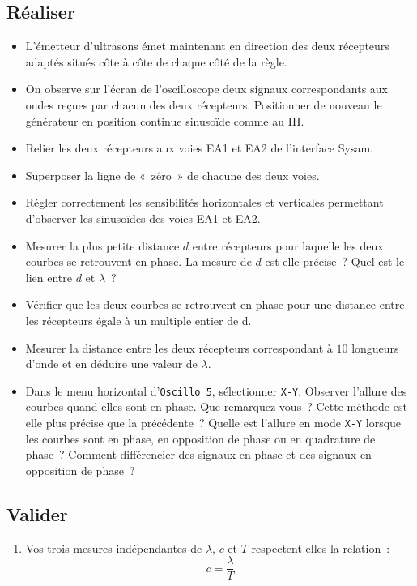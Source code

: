 \documentclass[a4paper, 11pt, final, garamond]{book}
\begin{document}
\subsection{Réaliser}

\begin{itemize}
    \item L'émetteur d'ultrasons émet maintenant en direction des deux
        récepteurs adaptés situés côte à côte de chaque côté de la règle.
    \item On observe sur l'écran de l'oscilloscope deux signaux correspondants
        aux ondes reçues par chacun des deux récepteurs. Positionner de nouveau
        le générateur en position continue sinusoïde comme au III.
    \item Relier les deux récepteurs aux voies EA1 et EA2 de l'interface Sysam.
    \item Superposer la ligne de «~zéro~» de chacune des deux voies. 
    \item Régler correctement les sensibilités horizontales et verticales
        permettant d'observer les sinusoïdes des voies EA1 et EA2.
    \item[\fbox{8}] Mesurer la plus petite distance $d$ entre récepteurs pour
        laquelle les deux courbes se retrouvent en phase. La mesure de $d$
        est-elle précise~? Quel est le lien entre $d$ et $\lambda$~?
    \item Vérifier que les deux courbes se retrouvent en phase pour une distance
        entre les récepteurs égale à un multiple entier de d.
    \item[\fbox{9}] Mesurer la distance entre les deux récepteurs correspondant
        à $10$ longueurs d'onde et en déduire une valeur de $\lambda$.
    \item[\fbox{10}] Dans le menu horizontal d'\texttt{Oscillo 5}, sélectionner
        \texttt{X-Y}. Observer l'allure des courbes quand elles sont en phase.
        Que remarquez-vous~? Cette méthode est-elle plus précise que la
        précédente~? Quelle est l'allure en mode \texttt{X-Y} lorsque les
        courbes sont en phase, en opposition de phase ou en quadrature de
        phase~? Comment différencier des signaux en phase et des signaux en
        opposition de phase~?
\end{itemize}

\subsection{Valider}

\begin{enumerate}[label=\sqenumi, start=11]
    \item Vos trois mesures indépendantes de $\lambda$, $c$ et $T$
        respectent-elles la relation~: 
        \[
            c = \frac{\lambda}{T}
        \]
\end{enumerate}
\end{document}
